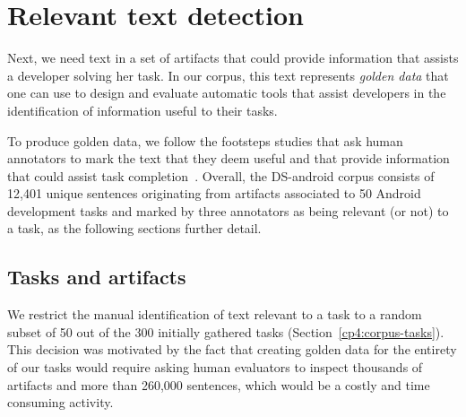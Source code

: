 \clearpage


\section{Relevant text detection}
\label{cp4:corpus-relevant-text}




Next, we need text in a set of artifacts that could provide information that assists a developer solving her task.
In our corpus, this text represents \textit{golden data} that one can use to design and evaluate  
automatic tools that assist developers in the identification of  information useful to their tasks. 




To produce golden data, we follow the footsteps studies that 
ask human annotators to
mark the text that they deem useful and that provide information that could assist task completion~\cite{nadi2020, Robillard2015, marques2020}.
Overall, 
the \acs{DS-android} corpus consists of  
12,401 unique sentences
originating from artifacts associated to 50 Android development tasks and 
marked by three annotators as being relevant (or not)
to a task, as the following sections further detail. 





\subsection{Tasks and artifacts}




We restrict the manual identification of text relevant to a task to a random subset of 
50  out of the 300 initially gathered tasks (Section~\ref{cp4:corpus-tasks}).
This decision was motivated by the fact that 
creating golden data for the entirety of our tasks 
would require asking human evaluators to inspect thousands of artifacts and more than 260,000 sentences, which would be a costly and time consuming activity. 




